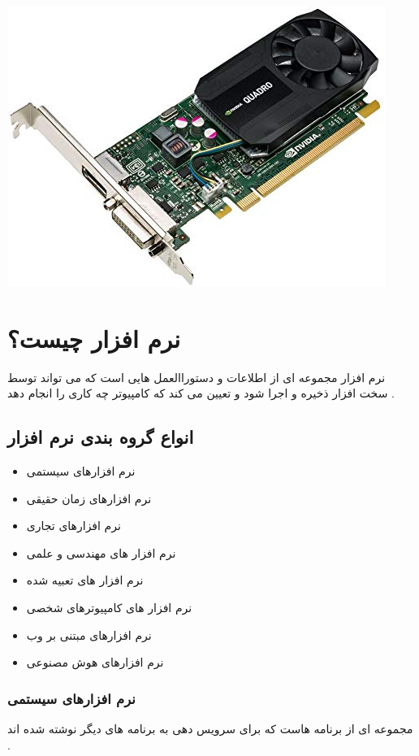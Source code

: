 \documentclass[12pt]{book}
\begin{document}
\begin{center}
	\includegraphics[scale=0.5]{./61iQVRX2hYL._AC_SX466_.jpg}
\end{center}


\section{نرم افزار چیست؟}

نرم افزار مجموعه ای از اطلاعات و دستوراالعمل هایی است که می تواند توسط سخت افزار ذخیره و اجرا شود و تعیین می کند که کامپیوتر چه کاری را انجام دهد .


\subsection{انواع گروه بندی نرم افزار}

\begin{itemize}
	\item نرم افزارهای سیستمی
	\item نرم افزارهای زمان حقیقی
	\item نرم افزارهای تجاری
	\item نرم افزار های مهندسی و علمی
	\item نرم افزار های تعبیه شده
	\item نرم افزار های کامپیوترهای شخصی
	\item نرم افزارهای مبتنی بر وب
	\item نرم افزارهای هوش مصنوعی
\end{itemize}


\subsubsection{نرم افزارهای سیستمی}
مجموعه ای از برنامه هاست که برای سرویس دهی به برنامه های دیگر نوشته شده اند .
\end{document}
